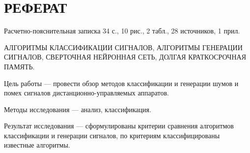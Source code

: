 \chapter*{РЕФЕРАТ}

Расчетно-пояснительная записка 34 с., 10 рис., 2 табл., 28 источников, 1 прил.

АЛГОРИТМЫ КЛАССИФИКАЦИИ СИГНАЛОВ, АЛГОРИТМЫ ГЕНЕРАЦИИ СИГНАЛОВ, СВЕРТОЧНАЯ НЕЙРОННАЯ СЕТЬ, ДОЛГАЯ КРАТКОСРОЧНАЯ ПАМЯТЬ.

Цель работы --- провести обзор методов классификации и генерации шумов и помех сигналов дистанционно-управляемых аппаратов.

Методы исследования --- анализ, классификация.

Результат исследования --- сформулированы критерии сравнения алгоритмов классификации и генерации сигналов, по критериям классифицированы известные алгоритмы.


